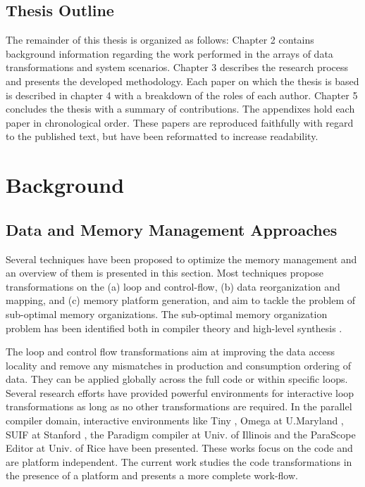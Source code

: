 \section{Thesis Outline}

The remainder of this thesis is organized as follows: Chapter 2 contains background information regarding the work performed in the arrays of data transformations and system scenarios. 
Chapter 3 describes the research process and presents the developed methodology.
Each paper on which the thesis is based is described in chapter 4 with a breakdown of the roles of each author. 
Chapter 5 concludes the thesis with a summary of contributions. 
The appendixes hold each paper in chronological order. 
These papers are reproduced faithfully with regard to the published text, but have been reformatted to increase readability.

\chapter{Background} 
\label{background}

\section{Data and Memory Management Approaches}
Several techniques have been proposed to optimize the memory management and an overview of them is presented in this section.
Most techniques propose transformations on the (a) loop and control-flow, (b) data reorganization and mapping, and (c) memory platform generation, and aim to tackle the problem of sub-optimal memory organizations.
The sub-optimal memory organization problem has been identified both in compiler theory \cite{43} and high-level synthesis \cite{519}.

The loop and control flow transformations aim at improving the data access locality and remove any mismatches in production and consumption ordering of data.
They can be applied globally across the full code or within specific loops.
Several research efforts have provided powerful environments for interactive loop transformations as long as no other transformations are required.
In the parallel compiler domain, interactive environments like Tiny \cite{556}, Omega at U.Maryland \cite{256}, SUIF at Stanford \cite{220}, the Paradigm compiler at Univ. of Illinois \cite{45} and the ParaScope Editor \cite{360} at Univ. of Rice have been presented. 
These works focus on the code and are platform independent.
The current work studies the code transformations in the presence of a platform and presents a more complete work-flow.

